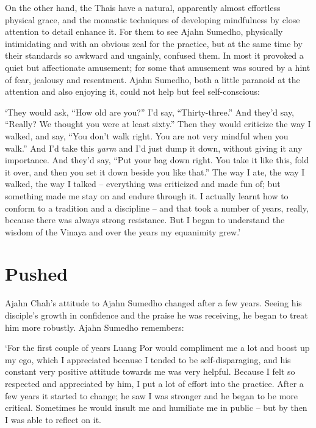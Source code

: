 On the other hand, the Thais have a natural, apparently almost
effortless physical grace, and the monastic techniques of developing
mindfulness by close attention to detail enhance it. For them to see
Ajahn Sumedho, physically intimidating and with an obvious zeal for
the practice, but at the same time by their standards so awkward and
ungainly, confused them. In most it provoked a quiet but affectionate
amusement; for some that amusement was soured by a hint of fear, 
jealousy and resentment. Ajahn Sumedho, both a little paranoid at the
attention and also enjoying it, could not help but feel self-conscious: 

`They would ask, ``How old are you?'' I'd say, ``Thirty-three.'' And
they'd say, ``Really? We thought you were at least sixty.'' Then they
would criticize the way I walked, and say, ``You don't walk right. You
are not very mindful when you walk.'' And I'd take this \emph{yarm} and
I'd just dump it down, without giving it any importance. And they'd say, 
``Put your bag down right. You take it like this, fold it over, and then
you set it down beside you like that.'' The way I ate, the way I walked, 
the way I talked -- everything was criticized and made fun of; but
something made me stay on and endure through it. I actually learnt how
to conform to a tradition and a discipline -- and that took a number of
years, really, because there was always strong resistance. But I began
to understand the wisdom of the Vinaya and over the years my equanimity
grew.'

\section{Pushed}

Ajahn Chah's attitude to Ajahn Sumedho changed after a few years. Seeing
his disciple's growth in confidence and the praise he was receiving, he
began to treat him more robustly. Ajahn Sumedho remembers: 

`For the first couple of years Luang Por would compliment me a lot and
boost up my ego, which I appreciated because I tended to be
self-disparaging, and his constant very positive attitude towards me was
very helpful. Because I felt so respected and appreciated by him, I put
a lot of effort into the practice. After a few years it started to
change; he saw I was stronger and he began to be more critical. 
Sometimes he would insult me and humiliate me in public -- but by then
I was able to reflect on it. 

